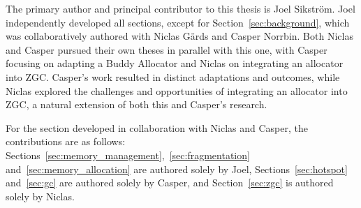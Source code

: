 
The primary author and principal contributor to this thesis is Joel Sikström. Joel independently developed all sections, except for Section~\ref{sec:background}, which was collaboratively authored with Niclas Gärds and Casper Norrbin. Both Niclas and Casper pursued their own theses in parallel with this one, with Casper focusing on adapting a Buddy Allocator and Niclas on integrating an allocator into ZGC. Casper's work resulted in distinct adaptations and outcomes, while Niclas explored the challenges and opportunities of integrating an allocator into ZGC, a natural extension of both this and Casper's research.

For the section developed in collaboration with Niclas and Casper, the contributions are as follows: Sections~\ref{sec:memory_management},~\ref{sec:fragmentation} and~\ref{sec:memory_allocation} are authored solely by Joel, Sections~\ref{sec:hotspot} and~\ref{sec:gc} are authored solely by Casper, and Section~\ref{sec:zgc} is authored solely by Niclas.


